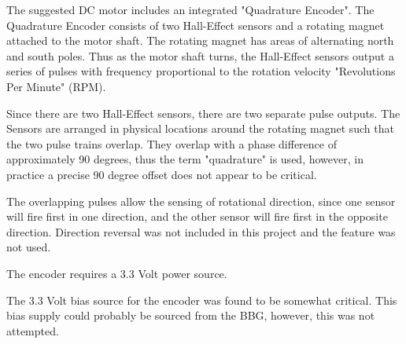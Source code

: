 The suggested DC motor includes an integrated "Quadrature Encoder".  The Quadrature Encoder consists of two Hall-Effect sensors and a rotating magnet attached to the motor shaft.  The rotating magnet has areas of alternating north and south poles.  Thus as the motor shaft turns, the Hall-Effect sensors output a series of pulses with frequency proportional to the rotation velocity "Revolutions Per Minute" (RPM).

Since there are two Hall-Effect sensors, there are two separate pulse outputs.  The Sensors are arranged in physical locations around the rotating magnet such that the two pulse trains overlap.  They overlap with a phase difference of approximately 90 degrees, thus the term "quadrature" is used, however, in practice a precise 90 degree offset does not appear to be critical.

The overlapping pulses allow the sensing of rotational direction, since one sensor will fire first in one direction, and the other sensor will fire first in the opposite direction.  Direction reversal was not included in this project and the feature was not used.

The encoder requires a 3.3 Volt power source.

The 3.3 Volt bias source for the encoder was found to be somewhat critical.  This bias supply could probably be sourced from the BBG, however, this was not attempted.